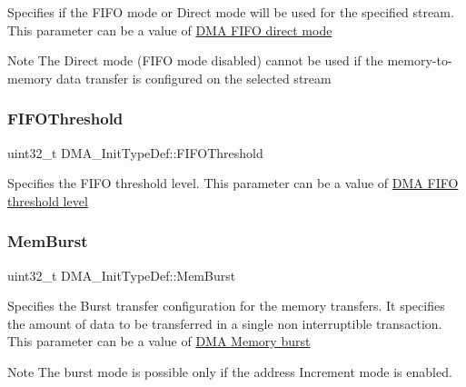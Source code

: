 Specifies if the F\+I\+FO mode or Direct mode will be used for the specified stream. This parameter can be a value of \hyperlink{group___d_m_a___f_i_f_o__direct__mode}{D\+MA F\+I\+FO direct mode} \begin{DoxyNote}{Note}
The Direct mode (F\+I\+FO mode disabled) cannot be used if the memory-\/to-\/memory data transfer is configured on the selected stream 
\end{DoxyNote}
\mbox{\label{struct_d_m_a___init_type_def_a2f994cc2979b82cd215e9f38edbbc6ed}} 
\subsubsection{\texorpdfstring{F\+I\+F\+O\+Threshold}{FIFOThreshold}}
{\footnotesize\ttfamily uint32\+\_\+t D\+M\+A\+\_\+\+Init\+Type\+Def\+::\+F\+I\+F\+O\+Threshold}

Specifies the F\+I\+FO threshold level. This parameter can be a value of \hyperlink{group___d_m_a___f_i_f_o__threshold__level}{D\+MA F\+I\+FO threshold level} \mbox{\label{struct_d_m_a___init_type_def_ad5e266a0b90f58365e21c349654bc68d}} 
\subsubsection{\texorpdfstring{Mem\+Burst}{MemBurst}}
{\footnotesize\ttfamily uint32\+\_\+t D\+M\+A\+\_\+\+Init\+Type\+Def\+::\+Mem\+Burst}

Specifies the Burst transfer configuration for the memory transfers. It specifies the amount of data to be transferred in a single non interruptible transaction. This parameter can be a value of \hyperlink{group___d_m_a___memory__burst}{D\+MA Memory burst} \begin{DoxyNote}{Note}
The burst mode is possible only if the address Increment mode is enabled. 
\end{DoxyNote}
\mbox{\label{struct_d_m_a___init_type_def_a7784efedc4a61325fa7364fcace10136}} 
